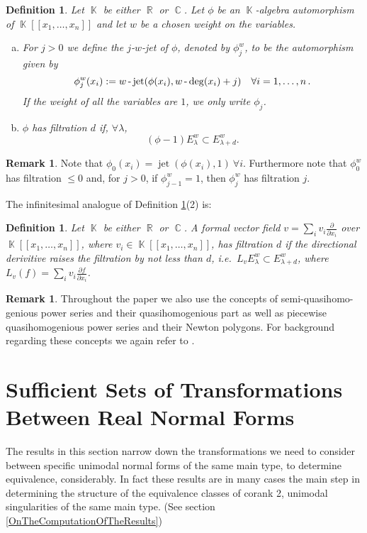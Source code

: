 \documentclass[noend]{amsproc}
\newtheorem{defn}[theorem]{Definition}
\theoremstyle{definition}
\newtheorem{remark}[theorem]{Remark}
\DeclareMathOperator{\R}{\mathbb{R}}
\DeclareMathOperator{\C}{\mathbb{C}}
\DeclareMathOperator{\K}{\mathbb{K}}
\DeclareMathOperator{\dash}{\textnormal{-}}
\DeclareMathOperator{\jet}{jet}
\begin{document}
\begin{defn}\label{phi}
Let $\K$ be either $\R$ or $\C$. Let $\phi$ be an $\K$-algebra automorphism of $\K[[x_1,\ldots,x_n]]$ and let $w$ be a chosen weight on the variables. 
\begin{enumerate}[(a)]
\item For $j > 0$ we define the
\emph{$j$-$w$-jet} of $\phi$, denoted by $\phi_j^w$, to be the automorphism given by
\[
\phi_j^w(x_i) := w\dash\jet(\phi(x_i),w\dash\deg(x_i)+j) \quad \forall i = 1,\ldots,n \,.
\]
If the weight of all the variables are $1$, we only write $\phi_j$.\\
\item $\phi$ has filtration $d$ if,  $\forall\lambda$,
\[(\phi-1)E_\lambda^w\subset E_{\lambda+d}^w.\]
\end{enumerate}
\end{defn}

\begin{remark}
Note that $\phi_0(x_i)=\jet(\phi(x_i),1)\ \forall i$. Furthermore note that $\phi_0^w$ has filtration $\le 0$ and, for $j>0$, if $\phi_{j-1}^w=1$, then $\phi_j^w$ has filtration $j$. 
\end{remark}

The infinitesimal analogue of Definition \ref{phi}(2) is:

\begin{defn}
Let $\K$ be either $\R$ or $\C$. A formal vector field $v=\sum_i v_i\frac{\partial}{\partial x_i}$ over $\K[[x_1,\ldots,x_n]]$, where $v_i\in\K[[x_1,\ldots,x_n]]$, has filtration $d$ if the directional derivitive raises the filtration by not less than $d$, i.e.~$L_vE^w_\lambda\subset E^w_{\lambda+d}$, where $L_v(f)=\sum_i v_i\frac{\partial f}{\partial x_i}$.
\end{defn}

\begin{remark}
Throughout the paper we also use the concepts of semi-quasihomo-genious power series and their quasihomogenious part as well as piecewise quasihomogenious power series and their Newton polygons. For background regarding these concepts we again refer to \cite{A1975}.
\end{remark}

\section{Sufficient Sets of Transformations Between Real Normal Forms}
The results in this section narrow down the transformations we need to consider between specific unimodal normal forms of the same main type, to determine equivalence, considerably. In fact these results are in many cases the main step in determining the structure of the equivalence classes of corank 2, unimodal singularities of the same main type. (See section \ref{OnTheComputationOfTheResults})
\end{document}
